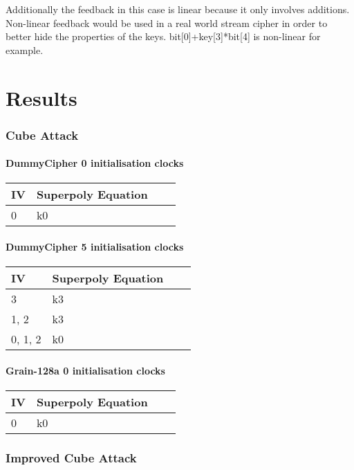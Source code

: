 \documentclass{report}
\let\Oldsubsection\subsection
\renewcommand{\subsection}{\FloatBarrier\Oldsubsection}
\let\Oldsubsubsection\subsubsection
\renewcommand{\subsubsection}{\FloatBarrier\Oldsubsubsection}
\begin{document}
\begin{appendices}
Additionally the feedback in this case is linear because it only involves additions. Non-linear feedback would be used in a real world stream cipher in order to better hide the properties of the keys. bit[0]+key[3]*bit[4] is non-linear for example.
\chapter{Results}
\subsection{Cube Attack}
\subsubsection{DummyCipher 0 initialisation clocks}
\begin{center}
    \begin{tabular}{| l | l | l | l |}
    \hline
    IV & Superpoly Equation\\ \hline
    {0} & k0\\ \hline
    \end{tabular}
\end{center}
\subsubsection{DummyCipher 5 initialisation clocks}
\begin{center}
    \begin{tabular}{| l | l | l | l |}
    \hline
    IV & Superpoly Equation\\ \hline
    {3} & k3\\ \hline
    {1, 2} & k3\\ \hline
    {0, 1, 2} & k0\\ \hline
    \end{tabular}
\end{center}
\subsubsection{Grain-128a 0 initialisation clocks}
\begin{center}
    \begin{tabular}{| l | l | l | l |}
    \hline
    IV & Superpoly Equation\\ \hline
    {0} & k0\\ \hline
    \end{tabular}
\end{center}

\subsection{Improved Cube Attack}
\end{appendices}
\end{document}
